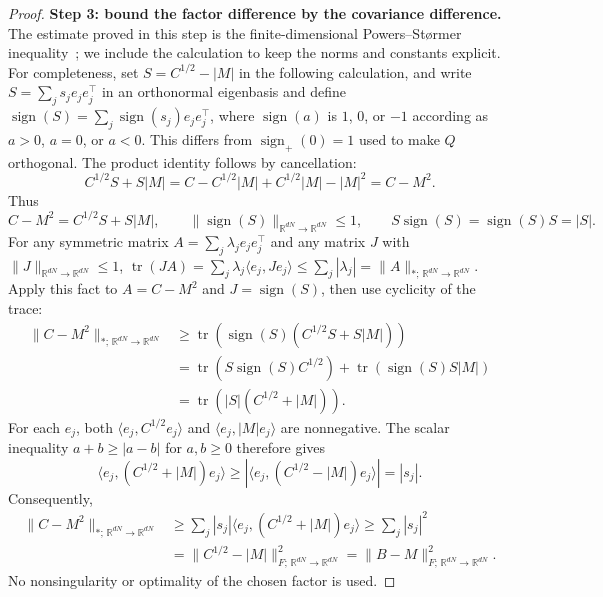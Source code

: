 \begin{proof}
\par\noindent\textbf{Step 3: bound the factor difference by the covariance difference.}
The estimate proved in this step is the finite-dimensional
Powers--St{\o}rmer inequality~\citep{powers1970free}; we include the calculation
to keep the norms and constants explicit.
For completeness, set $S=C^{1/2}-|M|$ in the following calculation, and
write $S=\sum_js_je_je_j^\top$ in an orthonormal eigenbasis and define
$\operatorname{sign}(S)=\sum_j\operatorname{sign}(s_j)e_je_j^\top$,
where $\operatorname{sign}(a)$ is $1$, $0$, or $-1$ according as
$a>0$, $a=0$, or $a<0$. This differs from
$\operatorname{sign}_+(0)=1$ used to make $Q$ orthogonal.
The product identity follows by cancellation:
\[
 C^{1/2}S+S|M|
 =C-C^{1/2}|M|+C^{1/2}|M|-|M|^2=C-M^2.
\]
Thus
\[
 C-M^2=C^{1/2}S+S|M|,\qquad
 \|\operatorname{sign}(S)\|_{\mathbb R^{dN}\to\mathbb R^{dN}}\le1,\qquad
 S\operatorname{sign}(S)=\operatorname{sign}(S)S=|S|.
\]
For any symmetric matrix $A=\sum_j\lambda_je_je_j^\top$ and any
matrix $J$ with $\|J\|_{\mathbb R^{dN}\to\mathbb R^{dN}}\le1$,
$\operatorname{tr}(JA)=\sum_j\lambda_j\langle e_j,Je_j\rangle
\le\sum_j|\lambda_j|=\|A\|_{*;\,\mathbb R^{dN}\to\mathbb R^{dN}}$. Apply this fact to $A=C-M^2$
and $J=\operatorname{sign}(S)$, then use cyclicity of the trace:
\[
\begin{aligned}
 \|C-M^2\|_{*;\,\mathbb R^{dN}\to\mathbb R^{dN}}
 &\ge\operatorname{tr}(\operatorname{sign}(S)(C^{1/2}S+S|M|))\\
 &=\operatorname{tr}(S\operatorname{sign}(S)C^{1/2})
        +\operatorname{tr}(\operatorname{sign}(S)S|M|)\\
 &=\operatorname{tr}(|S|(C^{1/2}+|M|)).
\end{aligned}
\]
For each $e_j$, both $\langle e_j,C^{1/2}e_j\rangle$ and
$\langle e_j,|M|e_j\rangle$ are nonnegative. The scalar inequality
$a+b\ge|a-b|$ for $a,b\ge0$ therefore gives
\[
 \langle e_j,(C^{1/2}+|M|)e_j\rangle
 \ge|\langle e_j,(C^{1/2}-|M|)e_j\rangle|=|s_j|.
\]
Consequently,
\[
\begin{aligned}
 \|C-M^2\|_{*;\,\mathbb R^{dN}\to\mathbb R^{dN}}
 &\ge\sum_j|s_j|\langle e_j,(C^{1/2}+|M|)e_j\rangle
 \ge\sum_j|s_j|^2\\
 &=\|C^{1/2}-|M|\|_{F;\,\mathbb R^{dN}\to\mathbb R^{dN}}^2
 =\|B-M\|_{F;\,\mathbb R^{dN}\to\mathbb R^{dN}}^2.
\end{aligned}
\]
No nonsingularity or optimality of the chosen factor is used.
\end{proof}


